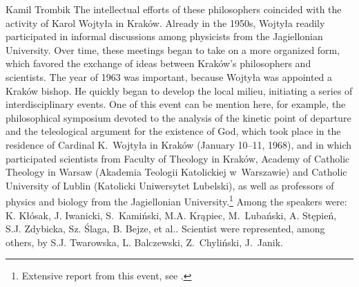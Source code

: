\begin{artengenv}{Kamil Trombik}
The intellectual efforts of these philosophers coincided with the activity of Karol Wojtyła in Kraków. Already in the
1950s, Wojtyła readily participated in informal discussions among physicists from the Jagiellonian University. Over
time, these meetings began to take on a more organized form, which favored the exchange of ideas between Kraków's
philosophers and scientists. The year of 1963 was important, because Wojtyła was appointed a Kraków bishop. He quickly
began to develop the local milieu, initiating a series of interdisciplinary events. One of this event can be mention
here, for example, the philosophical symposium devoted to the analysis of the kinetic point of departure and the
teleological argument for the existence of God, which took place in the residence of Cardinal K.~Wojtyła in Kraków
(January 10--11, 1968), and in which participated scientists from Faculty of Theology in Kraków, Academy of Catholic
Theology in Warsaw (Akademia Teologii Katolickiej w~Warszawie) and Catholic University of Lublin (Katolicki Uniwersytet
Lubelski), as well as professors of physics and biology from the Jagiellonian
University.\footnote{Extensive report from this event, see
\parencite{morawiec_sympozjum_1968}.
} Among the speakers were: K. Kłósak,
J. Iwanicki, S.~Kamiński, M.A. Krąpiec, M.~Lubański, A. Stępień, S.J. Zdybicka, Sz. Ślaga, B. Bejze, et al.. Scientist
were represented, among others, by S.J. Twarowska, L. Balczewski, Z.~Chyliński, J.~Janik.


\end{artengenv}
